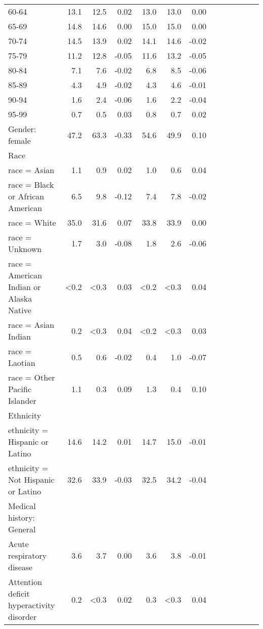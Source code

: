 \documentclass[11pt,]{article}
\begin{document}
\begin{longtable}{lrrrrrrrrrrrr}
      60-64 & 13.1 & 12.5 &  0.02 & 13.0 & 13.0 &  0.00 \\ 
      65-69 & 14.8 & 14.6 &  0.00 & 15.0 & 15.0 &  0.00 \\ 
      70-74 & 14.5 & 13.9 &  0.02 & 14.1 & 14.6 & -0.02 \\ 
      75-79 & 11.2 & 12.8 & -0.05 & 11.6 & 13.2 & -0.05 \\ 
      80-84 &  7.1 &  7.6 & -0.02 &  6.8 &  8.5 & -0.06 \\ 
      85-89 &  4.3 &  4.9 & -0.02 &  4.3 &  4.6 & -0.01 \\ 
      90-94 &  1.6 &  2.4 & -0.06 &  1.6 &  2.2 & -0.04 \\ 
      95-99 &  0.7 &  0.5 &  0.03 &  0.8 &  0.7 &  0.02 \\ 
  Gender: female & 47.2 & 63.3 & -0.33 & 54.6 & 49.9 &  0.10 \\ 
  Race &    &    &     &    &    &     \\ 
      race = Asian &  1.1 &  0.9 &  0.02 &  1.0 &  0.6 &  0.04 \\ 
      race = Black or African American &  6.5 &  9.8 & -0.12 &  7.4 &  7.8 & -0.02 \\ 
      race = White & 35.0 & 31.6 &  0.07 & 33.8 & 33.9 &  0.00 \\ 
      race = Unknown &  1.7 &  3.0 & -0.08 &  1.8 &  2.6 & -0.06 \\ 
      race = American Indian or Alaska Native & <0.2 & <0.3 &  0.03 & <0.2 & <0.3 &  0.04 \\ 
      race = Asian Indian &  0.2 & <0.3 &  0.04 & <0.2 & <0.3 &  0.03 \\ 
      race = Laotian &  0.5 &  0.6 & -0.02 &  0.4 &  1.0 & -0.07 \\ 
      race = Other Pacific Islander &  1.1 &  0.3 &  0.09 &  1.3 &  0.4 &  0.10 \\ 
  Ethnicity &    &    &     &    &    &     \\ 
      ethnicity = Hispanic or Latino & 14.6 & 14.2 &  0.01 & 14.7 & 15.0 & -0.01 \\ 
      ethnicity = Not Hispanic or Latino & 32.6 & 33.9 & -0.03 & 32.5 & 34.2 & -0.04 \\ 
  Medical history: General &    &    &     &    &    &     \\ 
      Acute respiratory disease &  3.6 &  3.7 &  0.00 &  3.6 &  3.8 & -0.01 \\ 
      Attention deficit hyperactivity disorder &  0.2 & <0.3 &  0.02 &  0.3 & <0.3 &  0.04 \\ 

\end{longtable}
\end{document}
